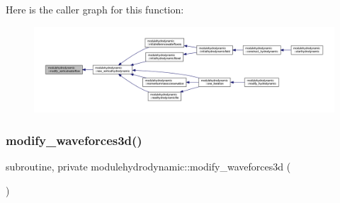 Here is the caller graph for this function\+:\nopagebreak
\begin{figure}[H]
\begin{center}
\leavevmode
\includegraphics[width=350pt]{namespacemodulehydrodynamic_a46041cae58ee2c4998a230bec6a29842_icgraph}
\end{center}
\end{figure}
\mbox{\label{namespacemodulehydrodynamic_abb5a03f6dfc75e5c036b503550a4e315}} 
\subsubsection{\texorpdfstring{modify\+\_\+waveforces3d()}{modify\_waveforces3d()}}
{\footnotesize\ttfamily subroutine, private modulehydrodynamic\+::modify\+\_\+waveforces3d (\begin{DoxyParamCaption}{ }\end{DoxyParamCaption})\hspace{0.3cm}{\ttfamily [private]}}

